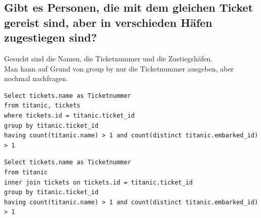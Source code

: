 \documentclass[a4paper, 11pt, titlepage]{article}
\begin{document}
\subsection{Gibt es Personen, die mit dem gleichen Ticket gereist sind, aber in verschieden Häfen 
zugestiegen sind?}
Gesucht sind die Namen, die Ticketnummer und die Zustiegshäfen.\\
Man kann auf Grund von group by nur die Ticketnummer ausgeben, aber nochmal nachfragen.
\begin{lstlisting}[style = sql]
Select tickets.name as Ticketnummer
from titanic, tickets
where tickets.id = titanic.ticket_id
group by titanic.ticket_id
having count(titanic.name) > 1 and count(distinct titanic.embarked_id) > 1
\end{lstlisting}
\begin{lstlisting}[style = sql]
Select tickets.name as Ticketnummer
from titanic
inner join tickets on tickets.id = titanic.ticket_id
group by titanic.ticket_id
having count(titanic.name) > 1 and count(distinct titanic.embarked_id) > 1
\end{lstlisting}
\end{document}
